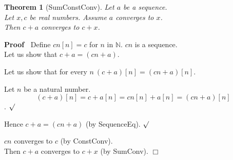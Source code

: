 \documentclass{article}
\newenvironment{forthel}{\begin{leftbar}}{\end{leftbar}}
\newenvironment{proof}{\noindent\textbf{Proof\ }}{\hspace*{\fill}$\Box$\medskip}
\newenvironment{subproof}{\begin{list}{}{}
		\item[\text{Proof}]}{\hfill $\surd$ \end{list}}
\newtheorem{theorem}{Theorem}
\newcommand{\NN}{\mathbb{N}}
\newcommand{\plusone}{+}
\newcommand{\plustwo}{+}
\newcommand{\dotequal}{=}
\begin{document}
\begin{forthel}
	\begin{theorem}[SumConstConv]
	Let $a$ be a sequence. \\Let $x,c$ be real numbers. Assume $a$ converges to $x$.
	\\Then $c \plustwo a$ converges to $c + x$.
	\end{theorem}
	\begin{proof}
	Define $cn[n] = c$ for $n$ in $\NN$.
	$cn$ is a sequence.
	\\Let us show that $c \plustwo a = (cn \plusone a)$.
	\begin{subproof}
	Let us show that for every $n \ (c \plustwo a)[n] = (cn \plusone a)[n]$.
	\begin{subproof}
	Let $n$ be a natural number.
	$$(c \plustwo a)[n] \dotequal c + a[n]
	\dotequal cn[n] + a[n]
	\dotequal (cn \plusone a)[n]$$.
	\end{subproof}
	Hence $c \plustwo a = (cn \plusone a)$ (by SequenceEq).
	\end{subproof}
	$cn$ converges to $c$ (by ConstConv).
	\\Then $c \plustwo a$ converges to $c + x$ (by SumConv).
	\end{proof}
	

\end{forthel}
\end{document}
